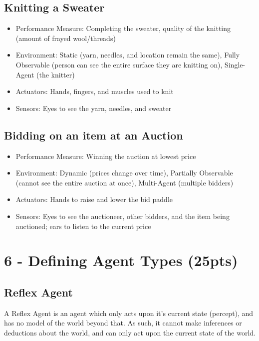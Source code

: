 \documentclass{article}
\begin{document}
\subsection*{Knitting a Sweater}

\begin{itemize}
    \item Performance Measure: Completing the sweater, quality of the knitting (amount of frayed wool/threads)
    \item Environment: Static (yarn, needles, and location remain the same), Fully Observable (person can see the entire surface they are knitting on), Single-Agent (the knitter)
    \item Actuators: Hands, fingers, and muscles used to knit
    \item Sensors: Eyes to see the yarn, needles, and sweater
\end{itemize}

\subsection*{Bidding on an item at an Auction}

\begin{itemize}
    \item Performance Measure: Winning the auction at lowest price
    \item Environment: Dynamic (prices change over time), Partially Observable (cannot see the entire auction at once), Multi-Agent (multiple bidders)
    \item Actuators: Hands to raise and lower the bid paddle
    \item Sensors: Eyes to see the auctioneer, other bidders, and the item being auctioned; ears to listen to the current price
\end{itemize}

\newpage
\section*{6 - Defining Agent Types (25pts)}

\subsection*{Reflex Agent}

A Reflex Agent is an agent which only acts upon it's current state (percept), and has no model of the world beyond that. As such, it cannot make inferences or deductions about the world, and can only act upon the current state of the world.
\end{document}

